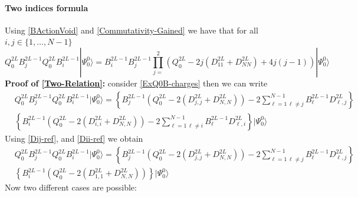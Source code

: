 \documentclass[10pt]{article}
\numberwithin{equation}{section}
\numberwithin{equation}{subsection}
\begin{document}
\paragraph{Two indices formula}
Using \eqref{BActionVoid} and \eqref{Commutativity-Gained} we have that for all $i,j\in\{1,\ldots,N-1\}$
\begin{equation}\label{Two-Relation}
	Q_{0}^{2L}B_{j}^{2L-1}Q_{0}^{2L}B_{i}^{2L-1}|\Psi_{0}^{0}\rangle=B_{i}^{2L-1}B_{j}^{2L-1}\prod_{j=}^{2}\left(Q_{0}^{2L}-2j(D_{11}^{2L}+D_{NN}^{2L})+4j(j-1)\right)|\Psi_{0}^{0}\rangle
\end{equation}
\textbf{Proof of \eqref{Two-Relation}:}
consider \eqref{ExQ0B-charges} then we can write 
\begin{align}
	&Q_{0}^{2L}B_{j}^{2L-1}Q_{0}^{2L}B_{i}^{2L-1}|\Psi_{0}^{0}\rangle=\left\{B_{j}^{2L-1}\left(Q_{0}^{2L}-2(D_{j,j}^{2L}+D_{N,N}^{2L})\right)-2\sum_{\ell=1\,\ell\neq j}^{N-1}B_{\ell}^{2L-1}D_{\ell,j}^{2L}\right\}\nonumber\\&\left\{B_{i}^{2L-1}\left(Q_{0}^{2L}-2(D_{i,i}^{2L}+D_{N,N}^{2L})\right)-2\sum_{\ell=1\,\ell\neq i}^{N-1}B_{\ell}^{2L-1}D_{\ell,i}^{2L}\right\}|\Psi_{0}^{0}\rangle
\end{align}
Using \eqref{Dij-ref}, and \eqref{Dii-ref} we obtain 
\begin{align}
	&Q_{0}^{2L}B_{j}^{2L-1}Q_{0}^{2L}B_{i}^{2L-1}|\Psi_{0}^{0}\rangle=\left\{B_{j}^{2L-1}\left(Q_{0}^{2L}-2(D_{j,j}^{2L}+D_{N,N}^{2L})\right)-2\sum_{\ell=1\,\ell\neq j}^{N-1}B_{\ell}^{2L-1}D_{\ell,j}^{2L}\right\}\nonumber\\&\left\{B_{i}^{2L-1}\left(Q_{0}^{2L}-2(D_{1,1}^{2L}+D_{N,N}^{2L})\right)\right\}|\Psi_{0}^{0}\rangle
\end{align}
Now two different cases are possible:
\end{document}
